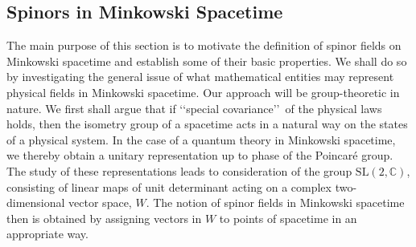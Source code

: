 
\subsection{Spinors in Minkowski Spacetime}\label{sec:13.1}

The main purpose of this section is to motivate the definition of spinor fields on
Minkowski spacetime and establish some of their basic properties. We shall do so by
investigating the general issue of what mathematical entities may represent physical
fields in Minkowski spacetime. Our approach will be group-theoretic in nature. We
first shall argue that if \lq\lq special covariance\rq\rq\ of the physical laws holds,
then the isometry group of a spacetime acts in a natural way on the states of a
physical system. In the case of a quantum theory in Minkowski spacetime, we thereby
obtain a unitary representation up to phase of the Poincar\'e group. The study of
these representations leads to consideration of the group \(\mathrm{SL}(2,\mathbb
C)\), consisting of linear maps of unit determinant acting on a complex
two-dimensional vector space, \(W\). The notion of spinor fields in Minkowski
spacetime then is obtained by assigning vectors in \(W\) to points of spacetime in an
appropriate way.

